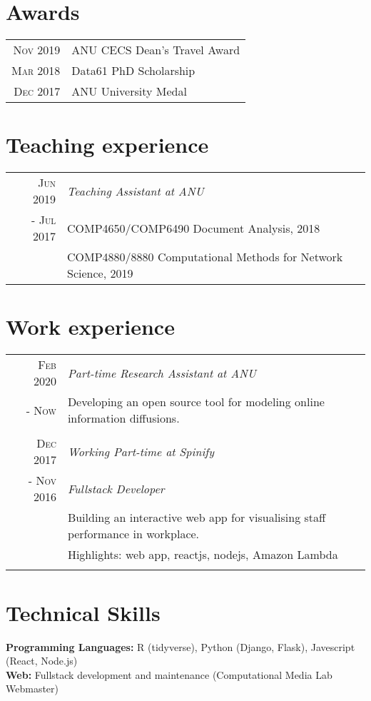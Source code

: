 \documentclass[a4paper,10pt]{article}
\begin{document}
\section{Awards}
\begin{tabular}{rl}
\textsc{Nov 2019} & ANU CECS Dean's Travel Award \\
\textsc{Mar 2018} & Data61 PhD Scholarship \\
\textsc{Dec 2017} & ANU University Medal \\
\end{tabular}

\section{Teaching experience}
\begin{tabular}{r|p{11cm}}
  \textsc{Jun 2019} & \textit{Teaching Assistant at ANU} \\\textsc{- Jul 2017}&\footnotesize{COMP4650/COMP6490 Document Analysis, 2018}\\&\footnotesize{COMP4880/8880 Computational Methods for Network Science, 2019}
\end{tabular}

\section{Work experience}
\begin{tabular}{r|p{11cm}}
  \textsc{Feb 2020} & \textit{Part-time Research Assistant at ANU} \\\textsc{- Now}&\footnotesize{Developing an open source tool for modeling online information diffusions.}\\
  \multicolumn{2}{c}{} \\
  
 \textsc{Dec 2017} & \textit{Working Part-time at Spinify} \\\textsc{- Nov 2016}&\emph{Fullstack Developer}\\&\footnotesize{Building an interactive web app for visualising staff performance in workplace.}\\& \footnotesize{Highlights: web app, reactjs, nodejs, Amazon Lambda}\\\multicolumn{2}{c}{}\\
\end{tabular}

\section{Technical Skills}
\textbf{Programming Languages:} R (tidyverse), Python (Django, Flask), Javescript (React, Node.js)\\
\textbf{Web:} Fullstack development and maintenance (Computational Media Lab Webmaster)\\
\end{document}
